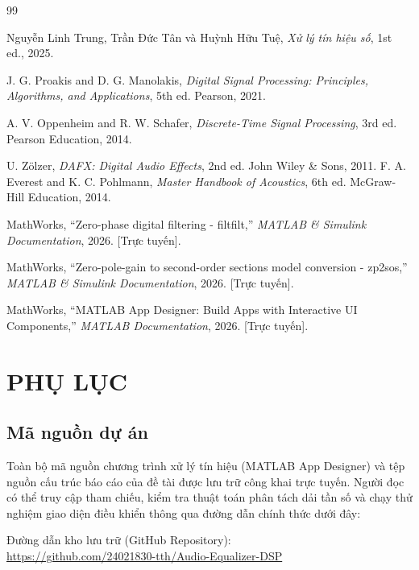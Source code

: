 \documentclass[12pt,a4paper]{article}
\begin{document}
\newpage
{} 
\renewcommand{\bibname}{Tài liệu tham khảo} 
\begin{thebibliography}{99}

Nguyễn Linh Trung, Trần Đức Tân và Huỳnh Hữu Tuệ, \textit{Xử lý tín hiệu số}, 1st ed., 2025.

J. G. Proakis and D. G. Manolakis, \textit{Digital Signal Processing: Principles, Algorithms, and Applications}, 5th ed. Pearson, 2021. 

A. V. Oppenheim and R. W. Schafer, \textit{Discrete-Time Signal Processing}, 3rd ed. Pearson Education, 2014.

U. Zölzer, \textit{DAFX: Digital Audio Effects}, 2nd ed. John Wiley \& Sons, 2011.
F. A. Everest and K. C. Pohlmann, \textit{Master Handbook of Acoustics}, 6th ed. McGraw-Hill Education, 2014.

MathWorks, ``Zero-phase digital filtering - filtfilt,'' \textit{MATLAB \& Simulink Documentation}, 2026. [Trực tuyến].

MathWorks, ``Zero-pole-gain to second-order sections model conversion - zp2sos,'' \textit{MATLAB \& Simulink Documentation}, 2026. [Trực tuyến]. 

MathWorks, ``MATLAB App Designer: Build Apps with Interactive UI Components,'' \textit{MATLAB Documentation}, 2026. [Trực tuyến]. 

\end{thebibliography}


\newpage

\clearpage 

\section*{PHỤ LỤC} 
{} 

\subsection*{Mã nguồn dự án} 
{} 

Toàn bộ mã nguồn chương trình xử lý tín hiệu (MATLAB App Designer) và tệp nguồn cấu trúc báo cáo của đề tài được lưu trữ công khai trực tuyến. Người đọc có thể truy cập tham chiếu, kiểm tra thuật toán phân tách dải tần số và chạy thử nghiệm giao diện điều khiển thông qua đường dẫn chính thức dưới đây:

\vspace{0.3cm}
\noindent Đường dẫn kho lưu trữ (GitHub Repository): \\
\url{https://github.com/24021830-tth/Audio-Equalizer-DSP}
\end{document}
